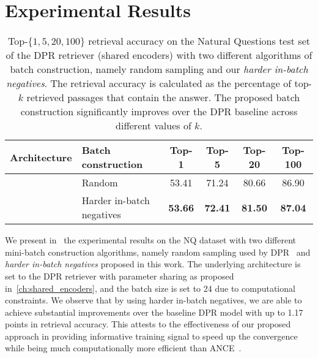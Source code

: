 \section{Experimental Results}
\label{sec:harder_inbatch_negatives_results}


\begin{table*}[t!]
	\setlength\tabcolsep{5pt}
	\centering
	\small
	\begin{tabular}{ll|cccc}
		\toprule
		\textbf{Architecture} & \textbf{Batch construction}
		& Top-1 & Top-5 & Top-20 & Top-100 \\ 
		\midrule
		& Random
		& 53.41 & 71.24 & 80.66 & 86.90 \\
		& Harder in-batch negatives
		& \textbf{53.66} & \textbf{72.41} & \textbf{81.50} & \textbf{87.04} \\
		\bottomrule
	\end{tabular}
	\caption[Top-$\{1, 5, 20, 100\}$ retrieval accuracy on the Natural Questions test set of the DPR retriever (shared encoders) with two different batch construction algorithms, namely random sampling (used in DPR~\cite{karpukhin2020dense}) and our \emph{harder in-batch negatives}.]{
		Top-$\{1, 5, 20, 100\}$ retrieval accuracy on the Natural Questions test set of the DPR retriever (shared encoders) with two different algorithms of batch construction, namely random sampling and our \emph{harder in-batch negatives}.
		The retrieval accuracy is calculated as the percentage of top-$k$ retrieved passages that contain the answer.
		The proposed batch construction significantly improves over the DPR baseline across different values of $k$.
	}
	
	\label{tab:multi_similarity_results}
\end{table*}


%
We present in~ the experimental results on the NQ dataset with two different mini-batch construction algorithms, namely random sampling used by DPR~\cite{karpukhin2020dense} and \emph{harder in-batch negatives} proposed in this work.
%
The underlying architecture is set to the DPR retriever with parameter sharing as proposed in~\cref{ch:shared_encoders}, and the batch size is set to 24 due to computational constraints.
%
We observe that by using harder in-batch negatives, we are able to achieve substantial improvements over the baseline DPR model with up to 1.17 points in retrieval accuracy.
%
This attests to the effectiveness of our proposed approach in providing informative training signal to speed up the convergence while being much computationally more efficient than ANCE~\cite{xiong2020approximate}.

